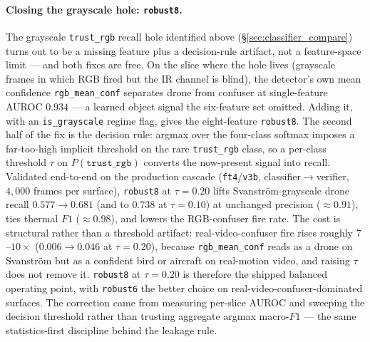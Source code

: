 \documentclass[12pt,a4paper,oneside,openright]{book}
\begin{document}
\paragraph{Closing the grayscale hole: \texttt{robust8}.}
The grayscale \texttt{trust\_rgb} recall hole identified above (\S\ref{sec:classifier_compare}) turns out to be a missing feature plus a decision-rule artifact, not a feature-space limit --- and both fixes are free. On the slice where the hole lives (grayscale frames in which RGB fired but the IR channel is blind), the detector's own mean confidence \texttt{rgb\_mean\_conf} separates drone from confuser at single-feature AUROC $0.934$ --- a learned object signal the six-feature set omitted. Adding it, with an \texttt{is\_grayscale} regime flag, gives the eight-feature \texttt{robust8}. The second half of the fix is the decision rule: argmax over the four-class softmax imposes a far-too-high implicit threshold on the rare \texttt{trust\_rgb} class, so a per-class threshold $\tau$ on $P(\texttt{trust\_rgb})$ converts the now-present signal into recall. Validated end-to-end on the production cascade (\texttt{ft4}/\texttt{v3b}, classifier$\to$verifier, $4{,}000$ frames per surface), \texttt{robust8} at $\tau{=}0.20$ lifts Svanstr\"om-grayscale drone recall $0.577 \to 0.681$ (and to $0.738$ at $\tau{=}0.10$) at unchanged precision ($\approx 0.91$), ties thermal $F1$ ($\approx 0.98$), and lowers the RGB-confuser fire rate. The cost is structural rather than a threshold artifact: real-video-confuser fire rises roughly $7$--$10\times$ ($0.006 \to 0.046$ at $\tau{=}0.20$), because \texttt{rgb\_mean\_conf} reads as a drone on Svanstr\"om but as a confident bird or aircraft on real-motion video, and raising $\tau$ does not remove it. \texttt{robust8} at $\tau{=}0.20$ is therefore the shipped balanced operating point, with \texttt{robust6} the better choice on real-video-confuser-dominated surfaces. The correction came from measuring per-slice AUROC and sweeping the decision threshold rather than trusting aggregate argmax macro-$F1$ --- the same statistics-first discipline behind the leakage rule.
\end{document}
